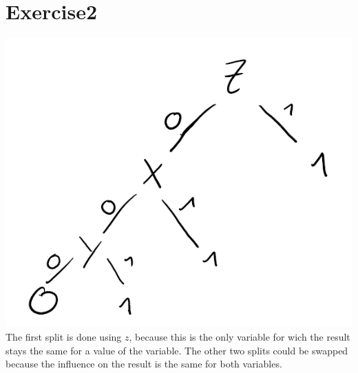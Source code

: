 \section*{Exercise2}
\includegraphics[scale=0.5]{E2Tree.png}
The first split is done using $z$, because this is the only variable for wich the result stays the same for a value of the variable.
The other two splits could be swapped because the influence on the result is the same for both variables.